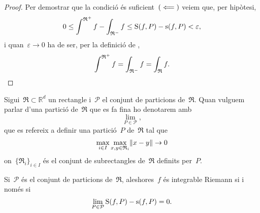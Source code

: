 \documentclass[../../main.tex]{subfiles}
\begin{document}
\begin{theorem}
\begin{proof}
            Per demostrar que la condició és suficient~\((\impliedby)\) veiem que, per hipòtesi,
            \[
                0\leq\int^{\mathfrak{R}^{+}}f-\int_{\mathfrak{R}^{-}}f\leq\operatorname{S}(f,P)-\operatorname{s}(f,P)<\varepsilon,
            \]
            i quan~\(\varepsilon\to0\) ha de ser, per la definició de ,
            \[
                \int^{\mathfrak{R}^{+}}f=\int_{\mathfrak{R}^{-}}f=\int_{\mathfrak{R}}f.\qedhere
            \]
        \end{proof}
        \begin{notation}
            Sigui~\(\mathfrak{R}\subset\mathbb{R}^{d}\) un rectangle i~\(\mathcal{P}\) el conjunt de particions de~\(\mathfrak{R}\).
            Quan vulguem parlar d'una partició de~\(\mathfrak{R}\) que es fa fina ho denotarem amb
            \[
                \lim_{P\in\mathcal{P}},
            \]
            que es refereix a definir una partició~\(P\) de~\(\mathfrak{R}\) tal que
            \[
                \max_{i\in I}\max_{x,y\in \mathfrak{R}_{i}}\norm{x-y}\to0
            \]
            on~\(\{\mathfrak{R}_{i}\}_{i\in I}\) és el conjunt de subrectangles de~\(\mathfrak{R}\) definits per~\(P\).
        \end{notation}
        \begin{corollary}\label{corollary:Sumes superior i inferior iguals integrable Riemann}
            Si~\(\mathcal{P}\) és el conjunt de particions de~\(\mathfrak{R}\), aleshores~\(f\) és integrable Riemann si i només si
            \[
                \lim_{P\in\mathcal{P}}\operatorname{S}(f,P)-\operatorname{s}(f,P)=0.
            \]%
        \end{corollary}
    \end{theorem}
\end{document}
